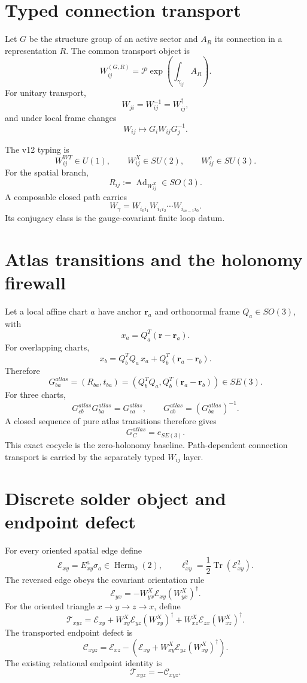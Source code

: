 \section{Typed connection transport}

Let \(G\) be the structure group of an active sector and \(A_R\) its connection
in a representation \(R\).  The common transport object is
\[
\boxed{
W_{ij}^{(G,R)}
=\mathcal P\exp\!\left(\int_{\gamma_{ij}}A_R\right).
}
\]
For unitary transport,
\[
\boxed{W_{ji}=W_{ij}^{-1}=W_{ij}^{\dagger}},
\]
and under local frame changes
\[
\boxed{W_{ij}\mapsto G_iW_{ij}G_j^{-1}}.
\]

The v12 typing is
\[
\boxed{
W_{ij}^{WT}\in U(1),
\qquad W_{ij}^{X}\in SU(2),
\qquad W_{ij}^{c}\in SU(3).
}
\]
For the spatial branch,
\[
\boxed{R_{ij}:=\operatorname{Ad}_{W_{ij}^{X}}\in SO(3)}.
\]
A composable closed path carries
\[
\boxed{W_\gamma=W_{i_0i_1}W_{i_1i_2}\cdots W_{i_{m-1}i_0}}.
\]
Its conjugacy class is the gauge-covariant finite loop datum.

\section{Atlas transitions and the holonomy firewall}

Let a local affine chart \(a\) have anchor \(\mathbf r_a\) and orthonormal
frame \(Q_a\in SO(3)\), with
\[
x_a=Q_a^T(\mathbf r-\mathbf r_a).
\]
For overlapping charts,
\[
\boxed{x_b=Q_b^TQ_a\,x_a+Q_b^T(\mathbf r_a-\mathbf r_b)}.
\]
Therefore
\[
\boxed{
G_{ba}^{atlas}
=(R_{ba},t_{ba})
=\left(Q_b^TQ_a,Q_b^T(\mathbf r_a-\mathbf r_b)\right)
\in SE(3).
}
\]
For three charts,
\[
G_{cb}^{atlas}G_{ba}^{atlas}=G_{ca}^{atlas},
\qquad
G_{ab}^{atlas}=(G_{ba}^{atlas})^{-1}.
\]
A closed sequence of pure atlas transitions therefore gives
\[
\boxed{G_C^{atlas}=e_{SE(3)}}.
\]
This exact cocycle is the zero-holonomy baseline.  Path-dependent connection
transport is carried by the separately typed \(W_{ij}\) layer.

\section{Discrete solder object and endpoint defect}

For every oriented spatial edge define
\[
\mathcal E_{xy}=E^a_{xy}\sigma_a\in\operatorname{Herm}_0(2),
\qquad
\ell_{xy}^2=\frac12\operatorname{Tr}(\mathcal E_{xy}^2).
\]
The reversed edge obeys the covariant orientation rule
\[
\boxed{
\mathcal E_{yx}
=-W_{yx}^{X}\mathcal E_{xy}(W_{yx}^{X})^\dagger.
}
\]
For the oriented triangle \(x\to y\to z\to x\), define
\[
\boxed{
\mathcal T_{xyz}
=\mathcal E_{xy}
+W_{xy}^{X}\mathcal E_{yz}(W_{xy}^{X})^\dagger
+W_{xz}^{X}\mathcal E_{zx}(W_{xz}^{X})^\dagger.
}
\]
The transported endpoint defect is
\[
\boxed{
\mathcal C_{xyz}
=\mathcal E_{xz}
-\left(
\mathcal E_{xy}
+W_{xy}^{X}\mathcal E_{yz}(W_{xy}^{X})^\dagger
\right).
}
\]
The existing relational endpoint identity is
\[
\boxed{\mathcal T_{xyz}=-\mathcal C_{xyz}}.
\]

